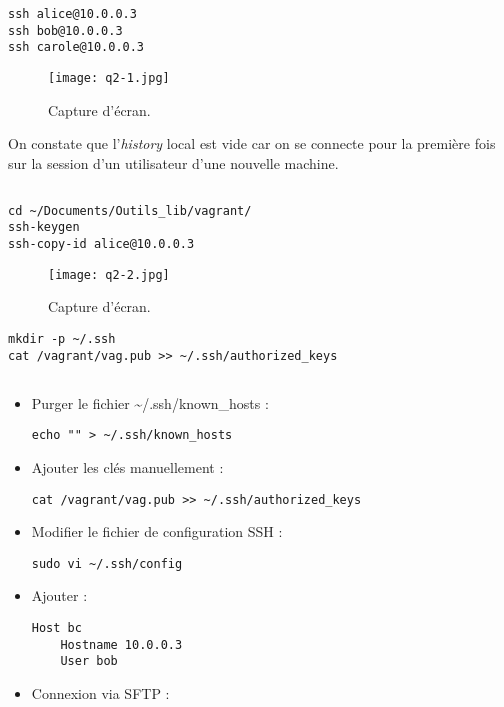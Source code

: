 \documentclass{article}
\begin{document}
\begin{lstlisting}
ssh alice@10.0.0.3
ssh bob@10.0.0.3
ssh carole@10.0.0.3
\end{lstlisting}

\begin{figure}[h]
\centering
\texttt{[image: q2-1.jpg]}
\caption{\label{fig:frog}Capture d'écran.}
\end{figure}

On constate que l'\emph{history} local est vide car on se connecte pour la première fois sur la session d'un utilisateur d'une nouvelle machine.

\subsection{}

\begin{lstlisting}
cd ~/Documents/Outils_lib/vagrant/
ssh-keygen
ssh-copy-id alice@10.0.0.3
\end{lstlisting}

\begin{figure}[h]
\centering
\texttt{[image: q2-2.jpg]}
\caption{\label{fig:frog}Capture d'écran.}
\end{figure}


\begin{lstlisting}
mkdir -p ~/.ssh
cat /vagrant/vag.pub >> ~/.ssh/authorized_keys
\end{lstlisting}

\subsection{}

\begin{itemize}
\item Purger le fichier \textasciitilde/.ssh/known\_hosts :
\begin{lstlisting}
echo "" > ~/.ssh/known_hosts
\end{lstlisting}
\item Ajouter les clés manuellement :
\begin{lstlisting}
cat /vagrant/vag.pub >> ~/.ssh/authorized_keys
\end{lstlisting}
\item Modifier le fichier de configuration SSH :
\begin{lstlisting}
sudo vi ~/.ssh/config
\end{lstlisting}
\item Ajouter :

\begin{lstlisting}
Host bc
	Hostname 10.0.0.3
	User bob
\end{lstlisting}
    \item Connexion via SFTP :
\end{itemize}
\end{document}
